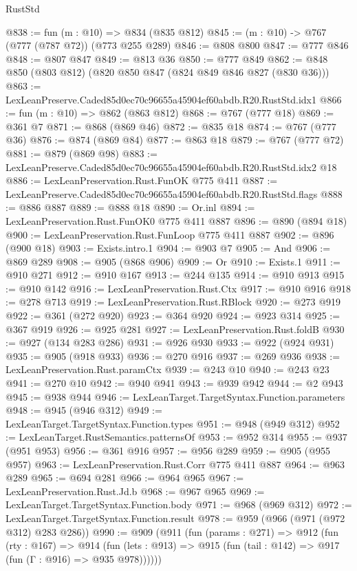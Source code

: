 \begin{lexlean}{RustStd}
\begin{coremodule}
@838 := fun (m : @10) => @834 (@835 @812)
@845 := (m : @10) -> @767 (@777 (@787 @72)) (@773 @255 @289)
@846 := @808 @800
@847 := @777 @846
@848 := @807 @847
@849 := @813 @36
@850 := @777 @849
@862 := @848 @850 (@803 @812) (@820 @850 @847 (@824 @849 @846 @827 (@830 @36)))
@863 := LexLeanPreserve.Caded85d0ec70c96655a45904ef60abdb.R20.RustStd.idx1
@866 := fun (m : @10) => @862 (@863 @812)
@868 := @767 (@777 @18)
@869 := @361 @7
@871 := @868 (@869 @46)
@872 := @835 @18
@874 := @767 (@777 @36)
@876 := @874 (@869 @84)
@877 := @863 @18
@879 := @767 (@777 @72)
@881 := @879 (@869 @98)
@883 := LexLeanPreserve.Caded85d0ec70c96655a45904ef60abdb.R20.RustStd.idx2 @18
@886 := LexLeanPreservation.Rust.FunOK @775 @411
@887 := LexLeanPreserve.Caded85d0ec70c96655a45904ef60abdb.R20.RustStd.flags
@888 := @886 @887
@889 := @888 @18
@890 := Or.inl
@894 := LexLeanPreservation.Rust.FunOK0 @775 @411 @887
@896 := @890 (@894 @18)
@900 := LexLeanPreservation.Rust.FunLoop @775 @411 @887
@902 := @896 (@900 @18)
@903 := Exists.intro.{1}
@904 := @903 @7
@905 := And
@906 := @869 @289
@908 := @905 (@868 @906)
@909 := Or
@910 := Exists.{1}
@911 := @910 @271
@912 := @910 @167
@913 := @244 @135
@914 := @910 @913
@915 := @910 @142
@916 := LexLeanPreservation.Rust.Ctx
@917 := @910 @916
@918 := @278 @713
@919 := LexLeanPreservation.Rust.RBlock
@920 := @273 @919
@922 := @361 (@272 @920)
@923 := @364 @920
@924 := @923 @314
@925 := @367 @919
@926 := @925 @281
@927 := LexLeanPreservation.Rust.foldB
@930 := @927 (@134 @283 @286)
@931 := @926 @930
@933 := @922 (@924 @931)
@935 := @905 (@918 @933)
@936 := @270 @916
@937 := @269 @936
@938 := LexLeanPreservation.Rust.paramCtx
@939 := @243 @10
@940 := @243 @23
@941 := @270 @10
@942 := @940 @941
@943 := @939 @942
@944 := @2 @943
@945 := @938 @944
@946 := LexLeanTarget.TargetSyntax.Function.parameters
@948 := @945 (@946 @312)
@949 := LexLeanTarget.TargetSyntax.Function.types
@951 := @948 (@949 @312)
@952 := LexLeanTarget.RustSemantics.patternsOf
@953 := @952 @314
@955 := @937 (@951 @953)
@956 := @361 @916
@957 := @956 @289
@959 := @905 (@955 @957)
@963 := LexLeanPreservation.Rust.Corr @775 @411 @887
@964 := @963 @289
@965 := @694 @281
@966 := @964 @965
@967 := LexLeanPreservation.Rust.Jd.b
@968 := @967 @965
@969 := LexLeanTarget.TargetSyntax.Function.body
@971 := @968 (@969 @312)
@972 := LexLeanTarget.TargetSyntax.Function.result
@978 := @959 (@966 (@971 (@972 @312) @283 @286))
@990 := @909
    (@911
      (fun (params : @271) =>
      @912
        (fun (rty : @167) =>
        @914
          (fun (lets : @913) => @915 (fun (tail : @142) => @917 (fun (Γ : @916) => @935 @978))))))

\end{coremodule}
\end{lexlean}
